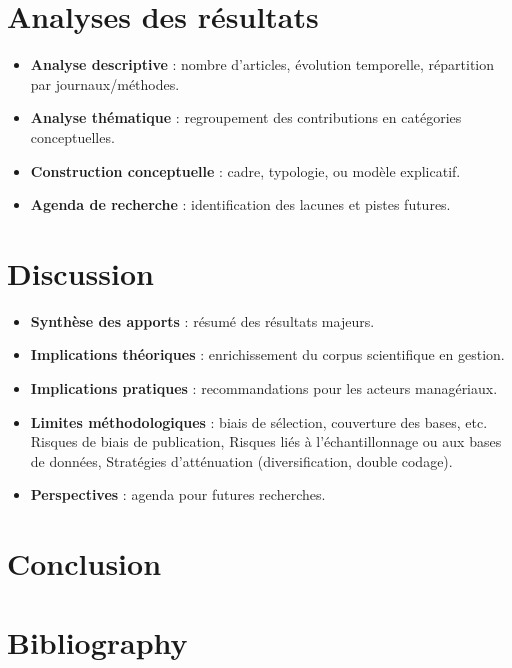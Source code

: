 \documentclass[a4paper,12pt]{article}
\begin{document}
\section{Analyses des résultats}
\label{sec:org1180faf}
\begin{itemize}
\item \textbf{\textbf{Analyse descriptive}} : nombre d’articles, évolution temporelle, répartition par journaux/méthodes.
\item \textbf{\textbf{Analyse thématique}} : regroupement des contributions en catégories conceptuelles.
\item \textbf{\textbf{Construction conceptuelle}} : cadre, typologie, ou modèle explicatif.
\item \textbf{\textbf{Agenda de recherche}} : identification des lacunes et pistes futures.
\end{itemize}
\section{Discussion}
\label{sec:orgc7be920}
\begin{itemize}
\item \textbf{\textbf{Synthèse des apports}} : résumé des résultats majeurs.
\item \textbf{\textbf{Implications théoriques}} : enrichissement du corpus scientifique en gestion.
\item \textbf{\textbf{Implications pratiques}} : recommandations pour les acteurs managériaux.
\item \textbf{\textbf{Limites méthodologiques}} : biais de sélection, couverture des bases, etc. Risques de biais de publication, Risques liés à l’échantillonnage ou aux bases de données, Stratégies d’atténuation (diversification, double codage).
\item \textbf{\textbf{Perspectives}} : agenda pour futures recherches.
\end{itemize}
\section{Conclusion}
\label{sec:orgf81d3e8}

\section{Bibliography}
\label{sec:org329939f}
\end{document}
